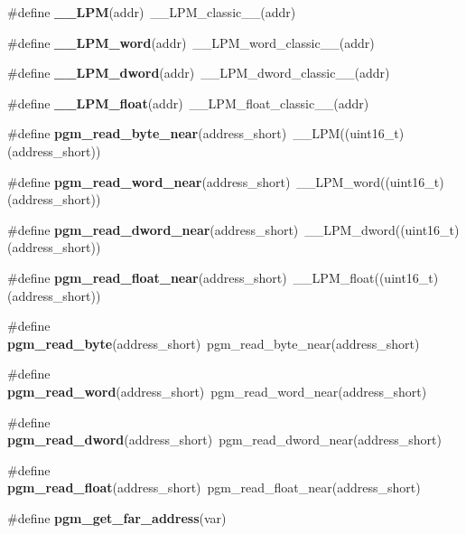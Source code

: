 \begin{DoxyCompactItemize}
\#define {\bf \_\-\_\-LPM}(addr)~\_\-\_\-LPM\_\-classic\_\-\_\-(addr)
\item 
\#define {\bf \_\-\_\-LPM\_\-word}(addr)~\_\-\_\-LPM\_\-word\_\-classic\_\-\_\-(addr)
\item 
\#define {\bf \_\-\_\-LPM\_\-dword}(addr)~\_\-\_\-LPM\_\-dword\_\-classic\_\-\_\-(addr)
\item 
\#define {\bf \_\-\_\-LPM\_\-float}(addr)~\_\-\_\-LPM\_\-float\_\-classic\_\-\_\-(addr)
\item 
\#define {\bf pgm\_\-read\_\-byte\_\-near}(address\_\-short)~\_\-\_\-LPM((uint16\_\-t)(address\_\-short))
\item 
\#define {\bf pgm\_\-read\_\-word\_\-near}(address\_\-short)~\_\-\_\-LPM\_\-word((uint16\_\-t)(address\_\-short))
\item 
\#define {\bf pgm\_\-read\_\-dword\_\-near}(address\_\-short)~\_\-\_\-LPM\_\-dword((uint16\_\-t)(address\_\-short))
\item 
\#define {\bf pgm\_\-read\_\-float\_\-near}(address\_\-short)~\_\-\_\-LPM\_\-float((uint16\_\-t)(address\_\-short))
\item 
\#define {\bf pgm\_\-read\_\-byte}(address\_\-short)~pgm\_\-read\_\-byte\_\-near(address\_\-short)
\item 
\#define {\bf pgm\_\-read\_\-word}(address\_\-short)~pgm\_\-read\_\-word\_\-near(address\_\-short)
\item 
\#define {\bf pgm\_\-read\_\-dword}(address\_\-short)~pgm\_\-read\_\-dword\_\-near(address\_\-short)
\item 
\#define {\bf pgm\_\-read\_\-float}(address\_\-short)~pgm\_\-read\_\-float\_\-near(address\_\-short)
\item 
\#define {\bf pgm\_\-get\_\-far\_\-address}(var)
\end{DoxyCompactItemize}
